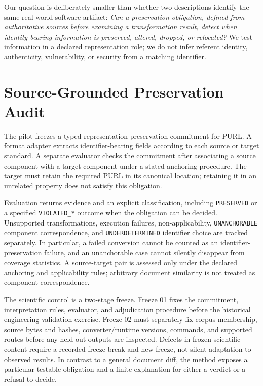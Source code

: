 \documentclass[conference,10pt]{IEEEtran}
\begin{document}
Our question is deliberately smaller than whether two descriptions identify
the same real-world software artifact:
\emph{Can a preservation obligation,
  defined from authoritative sources before examining a transformation result,
  detect when identity-bearing information is preserved, altered, dropped, or
  relocated?}
We test information in a declared representation role;
we do not infer referent identity, authenticity, vulnerability, or
security from a matching identifier.

\section{Source-Grounded Preservation Audit}

The pilot freezes a typed representation-preservation commitment for PURL.
A format adapter extracts identifier-bearing fields according to each
source or target standard.
A separate evaluator checks the commitment after
associating a source component with a target component under a stated
anchoring procedure.
The target must retain the required PURL in its canonical location;
retaining it in an unrelated property does not satisfy this obligation.

Evaluation returns evidence and an explicit classification, including
\texttt{PRESERVED} or a specified \texttt{VIOLATED\_*} outcome when the
obligation can be decided.
Unsupported transformations, execution failures,
non-applicability, \texttt{UNANCHORABLE} component correspondence, and
\texttt{UNDERDETERMINED} identifier choice are tracked separately.
In particular,
a failed conversion cannot be counted as an identifier-preservation failure, and
an unanchorable case cannot silently disappear from coverage statistics.
A source-target pair is assessed only under the declared anchoring
and applicability rules;
arbitrary document similarity is not treated as component correspondence.

The scientific control is a two-stage freeze.
Freeze 01 fixes the commitment, interpretation rules, evaluator, and
adjudication procedure before the historical engineering-validation exercise.
Freeze 02 must separately fix corpus membership, source bytes and hashes, converter/runtime versions,
commands, and supported routes before any held-out outputs are inspected.
Defects in frozen scientific content require a recorded freeze break and new
freeze, not silent adaptation to observed results.
In contrast to a general document diff,
the method exposes a particular testable obligation and a
finite explanation for either a verdict or a refusal to decide.
\end{document}
